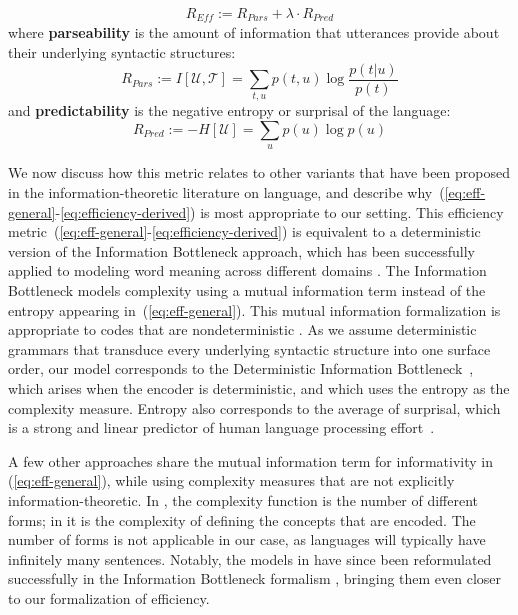 \documentclass[10pt,twoside,lineno]{article}
\newcommand{\key}[1]{\textbf{#1}}
\newcommand{\utterance}{\mathcal{U}}
\newcommand{\tree}{\mathcal{T}}
\begin{document}
\begin{equation}\label{eq:efficiency-derived}
	R_{\textit{Eff}} := R_{\textit{Pars}} + \lambda \cdot R_\textit{Pred}
\end{equation}
where \key{parseability} is the amount of information that utterances provide about their underlying syntactic structures:
\begin{equation}
	R_{Pars} := I[\utterance,\tree] = \sum_{t,u} p(t,u) \log \frac{p(t|u)}{p(t)}
\end{equation}
and \key{predictability} is the negative entropy or surprisal of the language:
\begin{equation}
	R_{Pred} := - H[\utterance] = \sum_{u} p(u) \log p(u)
\end{equation}

We now discuss how this metric relates to other variants that have been proposed in the information-theoretic literature on language, and describe why~(\ref{eq:eff-general}-\ref{eq:efficiency-derived}) is most appropriate to our setting.
This efficiency metric~(\ref{eq:eff-general}-\ref{eq:efficiency-derived}) is equivalent to a deterministic version \cite{strouse2017deterministic} of the Information Bottleneck approach, which has been successfully applied to modeling word meaning across different domains \cite{zaslavsky2018efficient, zaslavsky2019semantic}.
The Information Bottleneck models complexity using a mutual information term instead of the entropy appearing in~(\ref{eq:eff-general}).
This mutual information formalization is appropriate to codes that are nondeterministic \cite{zaslavsky2018efficient}.
As we assume deterministic grammars that transduce every underlying syntactic structure into one surface order, our model corresponds to the Deterministic Information Bottleneck~\cite{strouse2017deterministic}, which arises when the encoder is deterministic, and which uses the entropy as the complexity measure.
Entropy also corresponds to the average of surprisal, which is a strong and linear predictor of human language processing effort~\cite{hale2001probabilistic,levy2008expectation,smith2013effect}.

A few other approaches share the mutual information term for informativity in (\ref{eq:eff-general}), while using complexity measures that are not explicitly information-theoretic.
In \cite{regier2007color, xu2014numeral, xu2016historical}, the complexity function is the number of different forms; in \cite{kemp2012kinship} it is the complexity of defining the concepts that are encoded.
The number of forms is not applicable in our case, as languages will typically have infinitely many sentences.
Notably, the models in \cite{regier2007color, xu2016historical} have since been reformulated successfully in the Information Bottleneck formalism \cite{zaslavsky2018efficient, zaslavsky2019semantic}, bringing them even closer to our formalization of efficiency.
\end{document}
